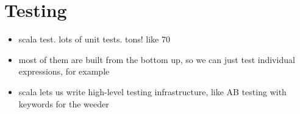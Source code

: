 \documentclass{article}
\begin{document}
\section{Testing}

\begin{itemize}
    \item scala test. lots of unit tests. tons! like 70
    \item most of them are built from the bottom up, so we can just test individual expressions, for example
    \item scala lets us write high-level testing infrastructure, like AB testing with keywords for the weeder
\end{itemize}
\end{document}
